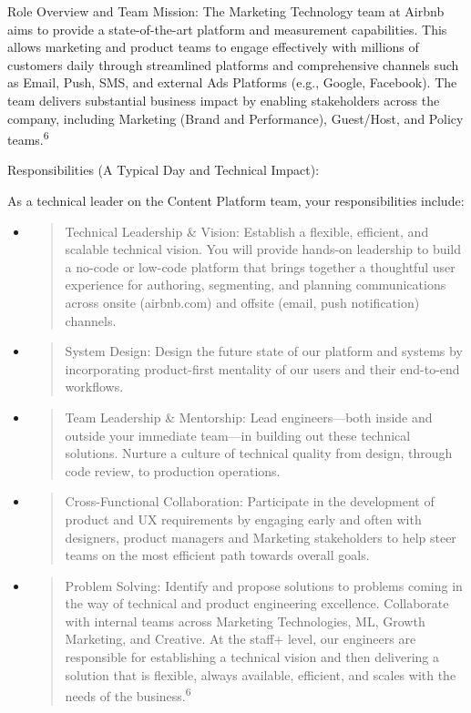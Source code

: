 \documentclass[12pt,a4paper]{article}
\begin{document}
Role Overview and Team Mission: The Marketing Technology team at Airbnb aims to provide a state-of-the-art platform and measurement capabilities. This allows marketing and product teams to engage effectively with millions of customers daily through streamlined platforms and comprehensive channels such as Email, Push, SMS, and external Ads Platforms (e.g., Google, Facebook). The team delivers substantial business impact by enabling stakeholders across the company, including Marketing (Brand and Performance), Guest/Host, and Policy teams.\textsuperscript{6}

Responsibilities (A Typical Day and Technical Impact):

As a technical leader on the Content Platform team, your responsibilities include:

\begin{itemize}
\item
  \begin{quote}
  Technical Leadership \& Vision: Establish a flexible, efficient, and scalable technical vision. You will provide hands-on leadership to build a no-code or low-code platform that brings together a thoughtful user experience for authoring, segmenting, and planning communications across onsite (airbnb.com) and offsite (email, push notification) channels.
  \end{quote}
\item
  \begin{quote}
  System Design: Design the future state of our platform and systems by incorporating product-first mentality of our users and their end-to-end workflows.
  \end{quote}
\item
  \begin{quote}
  Team Leadership \& Mentorship: Lead engineers---both inside and outside your immediate team---in building out these technical solutions. Nurture a culture of technical quality from design, through code review, to production operations.
  \end{quote}
\item
  \begin{quote}
  Cross-Functional Collaboration: Participate in the development of product and UX requirements by engaging early and often with designers, product managers and Marketing stakeholders to help steer teams on the most efficient path towards overall goals.
  \end{quote}
\item
  \begin{quote}
  Problem Solving: Identify and propose solutions to problems coming in the way of technical and product engineering excellence. Collaborate with internal teams across Marketing Technologies, ML, Growth Marketing, and Creative. At the staff+ level, our engineers are responsible for establishing a technical vision and then delivering a solution that is flexible, always available, efficient, and scales with the needs of the business.\textsuperscript{6}
  \end{quote}
\end{itemize}
\end{document}

